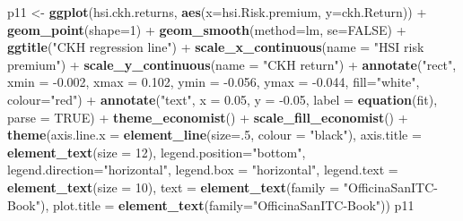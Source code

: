 \documentclass[]{article}
\newenvironment{Shaded}{\begin{snugshade}}{\end{snugshade}}
\newcommand{\KeywordTok}[1]{\textcolor[rgb]{0.13,0.29,0.53}{\textbf{{#1}}}}
\newcommand{\DataTypeTok}[1]{\textcolor[rgb]{0.13,0.29,0.53}{{#1}}}
\newcommand{\DecValTok}[1]{\textcolor[rgb]{0.00,0.00,0.81}{{#1}}}
\newcommand{\FloatTok}[1]{\textcolor[rgb]{0.00,0.00,0.81}{{#1}}}
\newcommand{\StringTok}[1]{\textcolor[rgb]{0.31,0.60,0.02}{{#1}}}
\newcommand{\OtherTok}[1]{\textcolor[rgb]{0.56,0.35,0.01}{{#1}}}
\newcommand{\NormalTok}[1]{{#1}}
\begin{document}
\begin{Shaded}
\begin{Highlighting}[]
\NormalTok{p11 <-}\StringTok{ }\KeywordTok{ggplot}\NormalTok{(hsi.ckh.returns, }\KeywordTok{aes}\NormalTok{(}\DataTypeTok{x=}\NormalTok{hsi.Risk.premium, }\DataTypeTok{y=}\NormalTok{ckh.Return)) +}\StringTok{ }\KeywordTok{geom_point}\NormalTok{(}\DataTypeTok{shape=}\DecValTok{1}\NormalTok{) +}\StringTok{ }\KeywordTok{geom_smooth}\NormalTok{(}\DataTypeTok{method=}\NormalTok{lm, }\DataTypeTok{se=}\OtherTok{FALSE}\NormalTok{) +}
\StringTok{  }\KeywordTok{ggtitle}\NormalTok{(}\StringTok{"CKH regression line"}\NormalTok{) +}
\StringTok{  }\KeywordTok{scale_x_continuous}\NormalTok{(}\DataTypeTok{name =} \StringTok{"HSI risk premium"}\NormalTok{) +}
\StringTok{  }\KeywordTok{scale_y_continuous}\NormalTok{(}\DataTypeTok{name =} \StringTok{"CKH return"}\NormalTok{) +}
\StringTok{  }\KeywordTok{annotate}\NormalTok{(}\StringTok{"rect"}\NormalTok{, }\DataTypeTok{xmin =} \NormalTok{-}\FloatTok{0.002}\NormalTok{, }\DataTypeTok{xmax =} \FloatTok{0.102}\NormalTok{, }\DataTypeTok{ymin =} \NormalTok{-}\FloatTok{0.056}\NormalTok{, }\DataTypeTok{ymax =} \NormalTok{-}\FloatTok{0.044}\NormalTok{, }\DataTypeTok{fill=}\StringTok{"white"}\NormalTok{, }
    \DataTypeTok{colour=}\StringTok{"red"}\NormalTok{) +}\StringTok{ }
\StringTok{  }\KeywordTok{annotate}\NormalTok{(}\StringTok{"text"}\NormalTok{, }\DataTypeTok{x =} \FloatTok{0.05}\NormalTok{, }\DataTypeTok{y =} \NormalTok{-}\FloatTok{0.05}\NormalTok{, }\DataTypeTok{label =} \KeywordTok{equation}\NormalTok{(fit), }\DataTypeTok{parse =} \OtherTok{TRUE}\NormalTok{) +}\StringTok{ }
\StringTok{  }\KeywordTok{theme_economist}\NormalTok{() +}\StringTok{ }\KeywordTok{scale_fill_economist}\NormalTok{() +}
\StringTok{  }\KeywordTok{theme}\NormalTok{(}\DataTypeTok{axis.line.x =} \KeywordTok{element_line}\NormalTok{(}\DataTypeTok{size=}\NormalTok{.}\DecValTok{5}\NormalTok{, }\DataTypeTok{colour =} \StringTok{"black"}\NormalTok{),}
    \DataTypeTok{axis.title =} \KeywordTok{element_text}\NormalTok{(}\DataTypeTok{size =} \DecValTok{12}\NormalTok{),}
    \DataTypeTok{legend.position=}\StringTok{"bottom"}\NormalTok{, }
    \DataTypeTok{legend.direction=}\StringTok{"horizontal"}\NormalTok{,}
    \DataTypeTok{legend.box =} \StringTok{"horizontal"}\NormalTok{, }
    \DataTypeTok{legend.text =} \KeywordTok{element_text}\NormalTok{(}\DataTypeTok{size =} \DecValTok{10}\NormalTok{),}
    \DataTypeTok{text =} \KeywordTok{element_text}\NormalTok{(}\DataTypeTok{family =} \StringTok{"OfficinaSanITC-Book"}\NormalTok{),}
    \DataTypeTok{plot.title =} \KeywordTok{element_text}\NormalTok{(}\DataTypeTok{family=}\StringTok{"OfficinaSanITC-Book"}\NormalTok{))}
\NormalTok{p11}
\end{Highlighting}
\end{Shaded}
\end{document}
